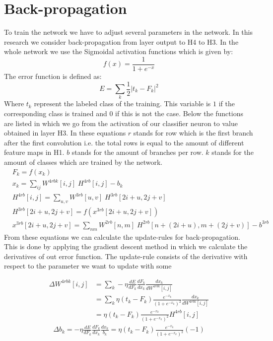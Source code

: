 \documentclass[a4paper,onecolumn]{report}
\begin{document}
\section{Back-propagation}
\label{sec:BP}
To train the network we have to adjust several parameters in the network. In this research we consider back-propagation from layer output to H4 to H3. In the whole network we use the Sigmoidal activation functions which is given by:
\begin{equation}
f(x)=\frac{1}{1+e^{-x}} 
\end{equation}	
The error function is defined as:
\begin{equation}
E=\sum_{k} \frac{1}{2}|t_k-F_{k}|^{2}
\end{equation}
Where $t_k$ represent the labeled class of the training. This variable is $1$ if the corresponding class is trained and $0$ if this is not the case. Below the functions are listed in which we go from the activation of our classifier neuron to value obtained in layer H3. In these equations $r$ stands for row which is the first branch after the first convolution i.e. the total rows is equal to the amount of different feature maps in H1. $b$ stands for the amount of branches per row. $k$ stands for the amount of classes which are trained by the network.
\begin{equation}
\begin{split}
	&F_{k}= f( x_{k}) \\
	& x_{k}=\sum_{ij} W^{4rbk}[i,j] \; H^{4rb}[i,j] - b_{k} \\
	&H^{4rb}[i,j]= \sum_{u,v} W^{3rb}[u,v] \; H^{3rb} [2i+u,2j+v] \\
	&H^{3rb} [2i+u,2j+v]= f\left (x^{3rb}[2i+u,2j+v] \right) \\
	&x^{3rb}[2i+u,2j+v]=\sum_{nm} W^{2rb}[n,m] \; H^{2rb}[n+(2i+u),m+(2j+v)] -b^{3rb}
\end{split}
\end{equation}
From these equations we can calculate the update-rules for back-propagation. This is done by applying the gradient descent method in which we calculate the derivatives of out error function. The update-rule consists of the derivative with respect to the parameter we want to update with some 

\begin{equation}
\begin{split}
\Delta W^{4rbk}[i,j]&= \sum_{k} - \eta \frac{dE}{d F_{k}} \frac{dF_{k}}{dx_{k}} \frac{dx_{k}}{dW^{4rbk}[i,j]} \\
&= \sum_{k} \eta (t_{k}-F_{k})\frac{e^{-x_{k}}}{(1+e^{-x_{k}})^{2}} \frac{dx_{k}}{dW^{4rbk}[i,j]} \\
&= \eta (t_{k}-F_{k})\frac{e^{-x_{k}}}{(1+e^{-x_{k}})^{2}} H^{4rb}[i,j]
\end{split}
\end{equation}
\begin{equation}
\begin{split}
\Delta b_{k}= - \eta \frac{dE}{d F_{k}} \frac{dF_{k}}{dx_{k}} \frac{dx_{k}}{b_{k}}=\eta (t_{k}-F_{k})\frac{e^{-x_{k}}}{(1+e^{-x_{k}})^{2}} (-1)
\end{split}
\end{equation}
\end{document}
